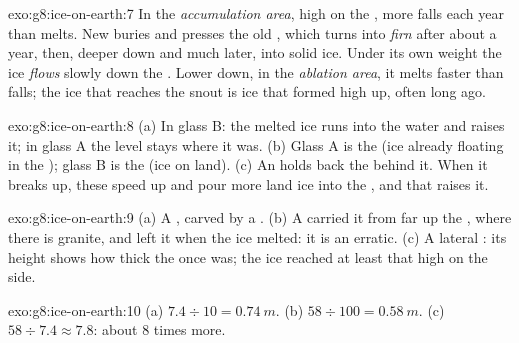 \begin{solution}{exo:g8:ice-on-earth:7}
In the \emph{accumulation area}, high on the , more  falls
each year than melts. New  buries and presses the old , which
turns into \emph{firn} after about a year, then, deeper down and much
later, into solid ice. Under its own weight the ice \emph{flows} slowly
down the . Lower down, in the \emph{ablation area}, it melts faster
than  falls; the ice that reaches the snout is ice that formed high
up, often long ago.
\end{solution}

\begin{solution}{exo:g8:ice-on-earth:8}
(a) In glass B: the melted ice runs into the water and raises it; in
glass A the level stays where it was. (b) Glass A is the  (ice
already floating in the ); glass B is the  (ice on land).
(c) An  holds back the  behind it. When it breaks up,
these  speed up and pour more land ice into the , and that
raises it.
\end{solution}

\begin{solution}{exo:g8:ice-on-earth:9}
(a) A , carved by a . (b) A  carried it from
far up the , where there is granite, and left it when the ice
melted: it is an erratic. (c) A lateral : its height shows how
thick the  once was; the ice reached at least that high on the
 side.
\end{solution}

\begin{solution}{exo:g8:ice-on-earth:10}
(a) $7.4 \div 10 = \qty{0.74}{m}$. (b) $58 \div 100 = \qty{0.58}{m}$.
(c) $58 \div 7.4 \approx 7.8$: about 8 times more.
\end{solution}

